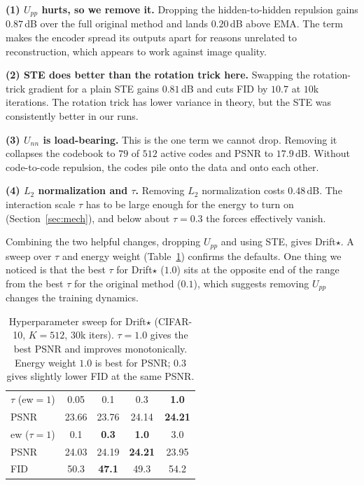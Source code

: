 \documentclass[10pt,twocolumn,letterpaper]{article}
\begin{document}
\noindent\textbf{(1) $U_{pp}$ hurts, so we remove it.} Dropping the hidden-to-hidden
repulsion gains $0.87$\,dB over the full original method and lands $0.20$\,dB above
EMA. The term makes the encoder spread its outputs apart for reasons unrelated to
reconstruction, which appears to work against image quality.

\noindent\textbf{(2) STE does better than the rotation trick here.} Swapping the
rotation-trick gradient for a plain STE gains $0.81$\,dB and cuts FID by $10.7$ at
$10$k iterations. The rotation trick has lower variance in theory, but the STE was
consistently better in our runs.

\noindent\textbf{(3) $U_{nn}$ is load-bearing.} This is the one term we cannot drop.
Removing it collapses the codebook to $79$ of $512$ active codes and PSNR to
$17.9$\,dB. Without code-to-code repulsion, the codes pile onto the data and onto each
other.

\noindent\textbf{(4) $L_2$ normalization and $\tau$.} Removing $L_2$ normalization
costs $0.48$\,dB. The interaction scale $\tau$ has to be large enough for the energy to
turn on (Section~\ref{sec:mech}), and below about $\tau{=}0.3$ the forces effectively
vanish.

Combining the two helpful changes, dropping $U_{pp}$ and using STE, gives Drift$\star$.
A sweep over $\tau$ and energy weight (Table~\ref{tab:sweep}) confirms the defaults.
One thing we noticed is that the best $\tau$ for Drift$\star$ ($1.0$) sits at the
opposite end of the range from the best $\tau$ for the original method ($0.1$), which
suggests removing $U_{pp}$ changes the training dynamics.

\begin{table}[ht]
\centering\small
\setlength{\tabcolsep}{5pt}
\begin{tabular}{lcccc}
\toprule
$\tau$ (ew$=1$) & 0.05 & 0.1 & 0.3 & \textbf{1.0}\\
PSNR & 23.66 & 23.76 & 24.14 & \textbf{24.21}\\
\midrule
ew ($\tau{=}1$) & 0.1 & \textbf{0.3} & \textbf{1.0} & 3.0\\
PSNR & 24.03 & 24.19 & \textbf{24.21} & 23.95\\
FID & 50.3 & \textbf{47.1} & 49.3 & 54.2\\
\bottomrule
\end{tabular}
\vspace{2mm}
\caption{Hyperparameter sweep for Drift$\star$ (CIFAR-10, $K{=}512$, $30$k iters).
$\tau{=}1.0$ gives the best PSNR and improves monotonically. Energy weight $1.0$ is
best for PSNR; $0.3$ gives slightly lower FID at the same PSNR.}
\label{tab:sweep}
\end{table}
\end{document}
